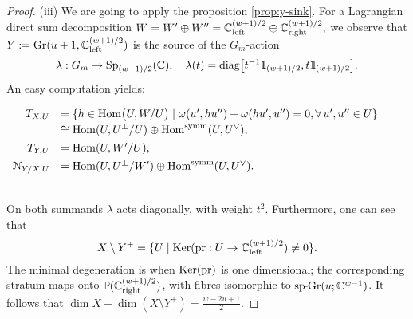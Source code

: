 \documentclass[11pt,reqno]{amsart}
\let\euf\EuScript
\let\mbb\mathbb
\let\nit\noindent
\numberwithin{equation}{section}
\numberwithin{figure}{section}
\let\l\lambda
\let\sm\setminus
\begin{document}
\begin{proof}
\nit(iii) 
We are going to apply the proposition \ref{prop:y-sink}. 
For a Lagrangian direct sum decomposition 
$W=W'\oplus W''={{\mbb C}}^{(w+1)/2}_{\rm left}\oplus{{\mbb C}}^{(w+1)/2}_{\rm right},$ 
we observe that $Y:={{\rm Gr}}(u+1,{{\mbb C}}^{(w+1)/2}_{\rm left})$ is the source of 
the $G_m$-action 
\begin{equation}\label{eq:l2}
\l:G_m\to{{\rm Sp}}_{(w+1)/2}({{\mbb C}}),\quad
\l(t)={\mathop{\rm diag}\nolimits}\big[t^{-1}{{1\kern-0.57ex\rm l}}_{(w+1)/2},t{{1\kern-0.57ex\rm l}}_{(w+1)/2}\big].
\end{equation}
An easy computation yields: 
\\[.5ex]\centerline{
$\begin{array}{rl}
T_{X,U}
&=
\{h\in{\mathop{\rm Hom}\nolimits}\big(U,W/U\big)\mid \omega(u',hu'')+\omega(hu',u'')=0,\forall\,u',u''\in U\}
\\[.5ex] 
&\cong{\mathop{\rm Hom}\nolimits}(U,U^\perp/U)\oplus{\mathop{\rm Hom}\nolimits}^{\rm symm}(U,U^\vee), 
\\[1ex] 
T_{Y,U}
&
={\mathop{\rm Hom}\nolimits}(U,W'/U), 
\\[1ex] 
{{\euf N}}_{Y/X, U}
&={\mathop{\rm Hom}\nolimits}(U,U^\perp/W')\oplus{\mathop{\rm Hom}\nolimits}^{\rm symm}(U,U^\vee). 
\end{array}$
}\\[.5ex]
On both summands $\l$ acts diagonally, with weight $t^2$. Furthermore, 
one can see that 
$$
X\sm Y^+=\{U\mid {{\rm Ker}}({\mathop{\rm pr}\nolimits}:U\to{{\mbb C}}^{(w+1)/2}_{\rm left})\neq 0\}.
$$ 
The minimal degeneration is when ${{\rm Ker}}({\mathop{\rm pr}\nolimits})$ is one dimensional; the corresponding 
stratum maps onto $\mbb P({{\mbb C}}^{(w+1)/2}_{\rm right})$, with fibres isomorphic to 
${{\rm sp{{{\vrule height2.75pt depth-2.35pt width2.3pt \kern1.7pt}}\!}Gr}}(u;{{\mbb C}}^{w-1})$. It follows that $\dim X-\dim(X\sm Y^+)=\frac{w-2u+1}{2}$. 
\end{proof}
\end{document}
